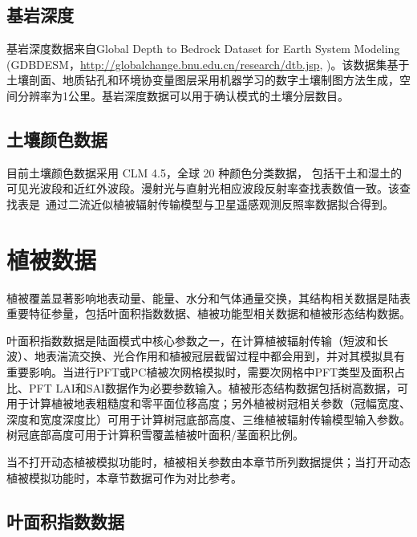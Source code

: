 \subsection{基岩深度}\label{基岩深度}

基岩深度数据来自Global Depth to Bedrock Dataset for Earth System Modeling (GDBDESM，\url{http://globalchange.bnu.edu.cn/research/dtb.jsp}, \citet{shangguan2017mapping})。该数据集基于土壤剖面、地质钻孔和环境协变量图层采用机器学习的数字土壤制图方法生成，空间分辨率为1公里。基岩深度数据可以用于确认模式的土壤分层数目。


\subsection{土壤颜色数据}\label{土壤颜色}

目前土壤颜色数据采用 CLM 4.5，全球 20 种颜色分类数据，
包括干土和湿土的可见光波段和近红外波段。漫射光与直射光相应波段反射率查找表数值一致。该查找表是~\citet{lawrence2007representing}通过二流近似植被辐射传输模型与卫星遥感观测反照率数据拟合得到。


\section{植被数据}\label{植被数据}

植被覆盖显著影响地表动量、能量、水分和气体通量交换，其结构相关数据是陆表重要特征参量，包括叶面积指数数据、植被功能型相关数据和植被形态结构数据。

叶面积指数数据是陆面模式中核心参数之一，在计算植被辐射传输（短波和长波）、地表湍流交换、光合作用和植被冠层截留过程中都会用到，并对其模拟具有重要影响。当进行PFT或PC植被次网格模拟时，需要次网格中PFT类型及面积占比、PFT LAI和SAI数据作为必要参数输入。植被形态结构数据包括树高数据，可用于计算植被地表粗糙度和零平面位移高度；另外植被树冠相关参数（冠幅宽度、深度和宽度深度比）可用于计算树冠底部高度、三维植被辐射传输模型输入参数。树冠底部高度可用于计算积雪覆盖植被叶面积/茎面积比例。

当不打开动态植被模拟功能时，植被相关参数由本章节所列数据提供；当打开动态植被模拟功能时，本章节数据可作为对比参考。


\subsection{叶面积指数数据}\label{叶面积指数数据}

